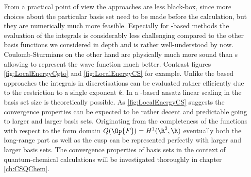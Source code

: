 From a practical point of view
the \ACO approaches are less black-box,
since more choices about the particular basis set need to be made before the calculation,
but they are numerically much more feasible.
Especially for \cGTO-based methods the evaluation of the integrals
is considerably less challenging compared to the other basis functions
we considered in depth and is rather well-understood by now.
Coulomb-Sturmians on the other hand are physically much more sound than
{\cGTO}s allowing to represent the wave function
much better.
Contrast figures \vref{fig:LocalEnergyCgto} and \vref{fig:LocalEnergyCS} for example.
Unlike the \STO based approaches
the integrals in \CS discretisations can be evaluated rather efficiently
due to the restriction to a single exponent $k$.
In a \contract-based ansatz linear scaling in the basis set size
is theoretically possible.
As \ref{fig:LocalEnergyCS} suggests the convergence properties
can be expected to be rather decent and predictable
going to larger and larger basis sets.
Originating from the completeness of the \CS functions
with respect to the form domain $Q(\Op{F}) = H^1(\R^3,\R)$
eventually both the long-range part as well as the cusp can be represented
perfectly with larger and larger basis sets.
The convergence properties of \CS basis sets in the context of
quantum-chemical calculations will be investigated
thoroughly in chapter \vref{ch:CSQChem}.
